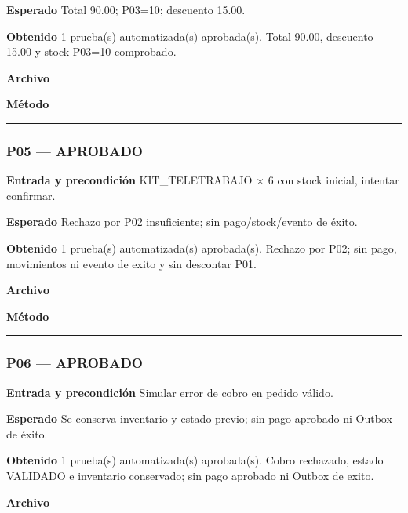 \textbf{Esperado} Total 90.00; P03=10; descuento 15.00.

\textbf{Obtenido} 1 prueba(s) automatizada(s) aprobada(s). Total 90.00, descuento 15.00 y stock P03=10 comprobado.

\textbf{Archivo} \href{https://github.com/Alan77-bot/LogiMarket360Alan/blob/68bda51063441415524ede51bdf61649ee9b4973/tests/LogiMarket.Tests/Aceptacion/CasosOficialesTests.cs}{}

\textbf{Método} 

\medskip\hrule\medskip
\subsubsection*{P05 --- APROBADO}
\textbf{Entrada y precondición} KIT\_TELETRABAJO  $\times$ 6 con stock inicial, intentar confirmar.

\textbf{Esperado} Rechazo por P02 insuficiente; sin pago/stock/evento de éxito.

\textbf{Obtenido} 1 prueba(s) automatizada(s) aprobada(s). Rechazo por P02; sin pago, movimientos ni evento de exito y sin descontar P01.

\textbf{Archivo} \href{https://github.com/Alan77-bot/LogiMarket360Alan/blob/68bda51063441415524ede51bdf61649ee9b4973/tests/LogiMarket.Tests/Aplicacion/ConfirmacionTests.cs}{}

\textbf{Método} 

\medskip\hrule\medskip
\subsubsection*{P06 --- APROBADO}
\textbf{Entrada y precondición} Simular error de cobro en pedido válido.

\textbf{Esperado} Se conserva inventario y estado previo; sin pago aprobado ni Outbox de éxito.

\textbf{Obtenido} 1 prueba(s) automatizada(s) aprobada(s). Cobro rechazado, estado VALIDADO e inventario conservado; sin pago aprobado ni Outbox de exito.

\textbf{Archivo} \href{https://github.com/Alan77-bot/LogiMarket360Alan/blob/68bda51063441415524ede51bdf61649ee9b4973/tests/LogiMarket.Tests/Aplicacion/ConfirmacionTests.cs}{}

